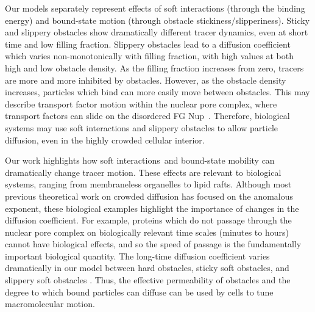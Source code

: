Our models separately represent effects of soft interactions (through the
binding energy) and bound-state motion (through obstacle
stickiness/slipperiness).  Sticky and slippery obstacles show dramatically
different tracer dynamics, even at short time and low filling fraction. Slippery
obstacles lead to a diffusion coefficient which varies non-monotonically with
filling fraction, with high values at both high and low obstacle density.  As
the filling fraction increases from zero, tracers are more and more inhibited by
obstacles.  However, as the obstacle density increases, particles which bind can
more easily move between obstacles.  This may describe transport factor motion
within the nuclear pore complex, where transport factors can slide on the
disordered FG Nup~\cite{raveh_slideandexchange_16}.  Therefore, biological
systems may use soft interactions and slippery obstacles to allow particle
diffusion, even in the highly crowded cellular interior.

Our work highlights how soft interactions\ and bound-state mobility can
dramatically change tracer motion. These effects are relevant to biological
systems, ranging from membraneless organelles to lipid rafts.  Although most
previous theoretical work on crowded diffusion has focused on the anomalous
exponent, these biological examples highlight the importance of changes in the
diffusion coefficient. For example, proteins which do not passage through the
nuclear pore complex on biologically relevant time scales (minutes to hours)
cannot have biological effects, and so the speed of passage is the fundamentally
important biological quantity. The long-time diffusion coefficient varies
dramatically in our model between hard obstacles, sticky soft obstacles, and
slippery soft obstacles .  Thus, the effective permeability
of obstacles and the degree to which bound particles can diffuse can be used by
cells to tune macromolecular motion.
